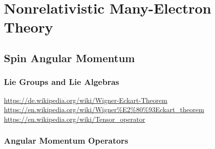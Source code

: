\documentclass[9pt]{report}
\begin{document}
\newpage
\chapter{Nonrelativistic Many-Electron Theory}


\section{Spin Angular Momentum}

\subsection{Lie Groups and Lie Algebras}
\url{https://de.wikipedia.org/wiki/Wigner-Eckart-Theorem}\\
\url{https://en.wikipedia.org/wiki/Wigner%E2%80%93Eckart_theorem}\\
\url{https://en.wikipedia.org/wiki/Tensor_operator}

\subsection{Angular Momentum Operators}
\end{document}
